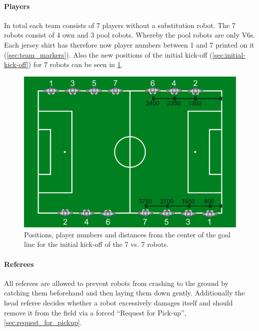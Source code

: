         \paragraph{Players}
            In total each team consists of 7 players without a substitution robot. The 7 robots consist of 4 own and 3 pool robots. Whereby the pool robots are only V6s. Each jersey shirt has therefore now player numbers between 1 and 7 printed on it (\cf \cref{sec:team_markers}). Also the new positions of the initial kick-off (\cf \cref{sec:initial-kick-off}) for 7 robots can be seen in \cref{fig:initial_positions_7vs7}.
            \begin{figure}[t!]
            	\begin{center}
            		\leavevmode
            		\includegraphics[width=1\columnwidth]{figs/initial_positions_7vs7.pdf}
            		\caption{Positions, player numbers and distances from the center of the goal line for the initial kick-off of the 7 vs. 7 robots.}
            		\label{fig:initial_positions_7vs7}
            	\end{center}
            \end{figure}

        \paragraph{Referees}
            \label{sec:7vs7:referee}
            All referees are allowed to prevent robots from crashing to the ground by catching them beforehand and then laying them down gently. Additionally the head referee decides whether a robot excessively damages itself and should remove it from the field via a forced ``Request for Pick-up'', \cf \cref{sec:request_for_pickup}.

